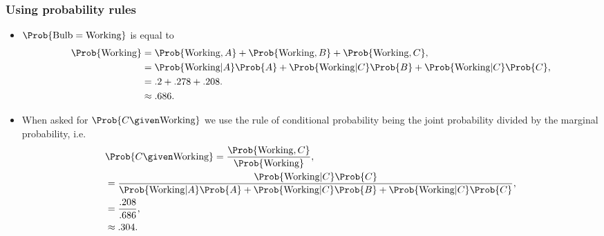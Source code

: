 \documentclass{slides}
\begin{document}
\begin{frame}
	\frametitle{Using probability rules}
	\begin{itemize}
	\item $\Prob{\text{Bulb}=\text{Working}}$ is equal to 
		{\small
\begin{align*}
\Prob{\text{Working}} &= \Prob{\text{Working},A} + \Prob{\text{Working}, B} + \Prob{\text{Working},C},\\
						  &= \Prob{\text{Working}\vert A}\Prob{A} + \Prob{\text{Working}\vert C}\Prob{B} + \Prob{\text{Working}\vert C}\Prob{C},\\
&= .2 + .278 + .208.\\
&\approx .686.
\end{align*}
}
\item When asked for $\Prob{C\given\text{Working}}$ we use the rule of conditional probability being the joint probability divided by the marginal probability, i.e. 
	{\small
\begin{align*}
	&\Prob{C\given\text{Working}} = \frac{\Prob{\text{Working},C}}{\Prob{\text{Working}}},\\
								       &= \frac{\Prob{\text{Working}\vert C}\Prob{C}}{\Prob{\text{Working}\vert A}\Prob{A} + \Prob{\text{Working}\vert C}\Prob{B} + \Prob{\text{Working}\vert C}\Prob{C}},\\
&= \frac{.208}{.686},\\
&\approx .304.
\end{align*}
}

	\end{itemize}
\end{frame}
\end{document}

